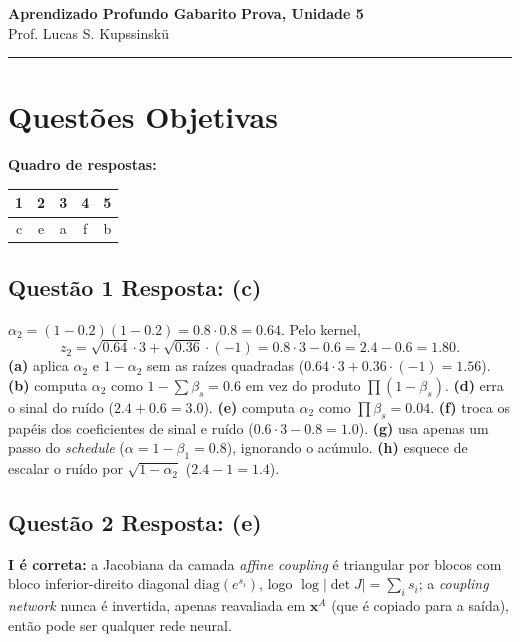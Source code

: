 \documentclass[11pt,a4paper]{article}
\begin{document}
{\Large\bfseries Aprendizado Profundo \textemdash{} Gabarito} \hfill \textbf{Prova, Unidade 5}\\
Prof. Lucas S. Kupssinskü

\rule{\linewidth}{0.8pt}

\section*{Questões Objetivas}

\textbf{Quadro de respostas:}
\begin{center}
\begin{tabular}{|c|c|c|c|c|}
\hline
1 & 2 & 3 & 4 & 5 \\\hline
c & e & a & f & b \\\hline
\end{tabular}
\end{center}

\color{blue}

\subsection*{Questão 1 \textemdash{} Resposta: (c)}
$\alpha_2 = (1 - 0.2)(1 - 0.2) = 0.8 \cdot 0.8 = 0.64$. Pelo kernel,
\[
  z_2 = \sqrt{0.64}\cdot 3 + \sqrt{0.36}\cdot(-1) = 0.8 \cdot 3 - 0.6 = 2.4 - 0.6 = 1.80.
\]
\textbf{(a)} aplica $\alpha_2$ e $1-\alpha_2$ sem as raízes quadradas ($0.64\cdot 3 + 0.36\cdot(-1) = 1.56$).
\textbf{(b)} computa $\alpha_2$ como $1 - \sum\beta_s = 0.6$ em vez do produto $\prod(1-\beta_s)$.
\textbf{(d)} erra o sinal do ruído ($2.4 + 0.6 = 3.0$).
\textbf{(e)} computa $\alpha_2$ como $\prod \beta_s = 0.04$.
\textbf{(f)} troca os papéis dos coeficientes de sinal e ruído ($0.6\cdot 3 - 0.8 = 1.0$).
\textbf{(g)} usa apenas um passo do \textit{schedule} ($\alpha = 1 - \beta_1 = 0.8$), ignorando o acúmulo.
\textbf{(h)} esquece de escalar o ruído por $\sqrt{1-\alpha_2}$ ($2.4 - 1 = 1.4$).

\subsection*{Questão 2 \textemdash{} Resposta: (e)}
\textbf{I é correta:} a Jacobiana da camada \textit{affine coupling} é triangular por blocos com bloco inferior-direito diagonal $\mathrm{diag}(e^{s_i})$, logo $\log|\det J| = \sum_i s_i$; a \textit{coupling network} nunca é invertida, apenas reavaliada em $\mathbf{x}^{A}$ (que é copiado para a saída), então pode ser qualquer rede neural.
\end{document}
